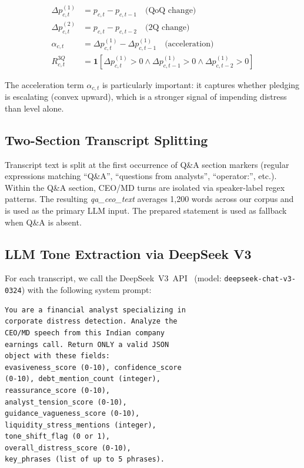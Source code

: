 \documentclass[conference]{IEEEtran}
\begin{document}
\begin{align}
  \Delta p_{c,t}^{(1)} &= p_{c,t} - p_{c,t-1} \quad \text{(QoQ change)} \\
  \Delta p_{c,t}^{(2)} &= p_{c,t} - p_{c,t-2} \quad \text{(2Q change)} \\
  \alpha_{c,t} &= \Delta p_{c,t}^{(1)} - \Delta p_{c,t-1}^{(1)} \quad \text{(acceleration)} \\
  R_{c,t}^{3Q} &= \mathbf{1}\!\left[\Delta p_{c,t}^{(1)}>0 \wedge \Delta p_{c,t-1}^{(1)}>0 \wedge \Delta p_{c,t-2}^{(1)}>0\right]
\end{align}

The acceleration term $\alpha_{c,t}$ is particularly important: it
captures whether pledging is escalating (convex upward), which is
a stronger signal of impending distress than level alone.

\subsection{Two-Section Transcript Splitting}
Transcript text is split at the first occurrence of Q\&A section
markers (regular expressions matching ``Q\&A'', ``questions from
analysts'', ``operator:'', etc.). Within the Q\&A section, CEO/MD turns
are isolated via speaker-label regex patterns. The resulting
\textit{qa\_ceo\_text} averages 1,200 words across our corpus and is
used as the primary LLM input. The prepared statement is used as
fallback when Q\&A is absent.

\subsection{LLM Tone Extraction via DeepSeek V3}
For each transcript, we call the DeepSeek~V3~API~\cite{deepseek2024v3}
(model: \texttt{deepseek-chat-v3-0324}) with the following system
prompt:

\begin{lstlisting}[caption={LLM tone extraction prompt},label={lst:prompt}]
You are a financial analyst specializing in
corporate distress detection. Analyze the
CEO/MD speech from this Indian company
earnings call. Return ONLY a valid JSON
object with these fields:
evasiveness_score (0-10), confidence_score
(0-10), debt_mention_count (integer),
reassurance_score (0-10),
analyst_tension_score (0-10),
guidance_vagueness_score (0-10),
liquidity_stress_mentions (integer),
tone_shift_flag (0 or 1),
overall_distress_score (0-10),
key_phrases (list of up to 5 phrases).
\end{lstlisting}
\end{document}
